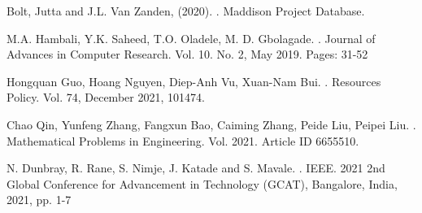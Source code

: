 \documentclass[12pt]{article}
\begin{document}
\newpage

\begin{thebibliography}{1}

Bolt, Jutta and J.L. Van Zanden, (2020).
.
\newblock Maddison Project Database.

M.A. Hambali, Y.K. Saheed, T.O. Oladele, M. D. Gbolagade.
.
\newblock Journal of Advances in Computer Research. Vol. 10. No. 2, May 2019. Pages: 31-52

Hongquan Guo, Hoang Nguyen, Diep-Anh Vu, Xuan-Nam Bui.
.
\newblock Resources Policy. Vol. 74, December 2021, 101474.

Chao Qin, Yunfeng Zhang, Fangxun Bao, Caiming Zhang, Peide Liu, Peipei Liu.
.
\newblock Mathematical Problems in Engineering. Vol. 2021. Article ID 6655510.

N. Dunbray, R. Rane, S. Nimje, J. Katade and S. Mavale.
.
\newblock IEEE. 2021 2nd Global Conference for Advancement in Technology (GCAT), Bangalore, India, 2021, pp. 1-7

\end{thebibliography}
\end{document}
